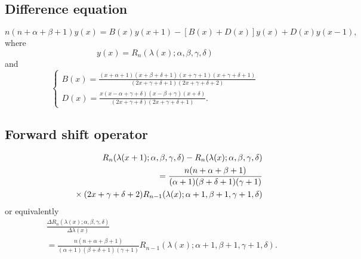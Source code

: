 \documentclass[envcountchap,graybox]{svmono}
\newcommand{\mathindent}{\hspace{7.5mm}}
\begin{document}
\subsection*{Difference equation}
\begin{equation}
\label{dvRacah}
n(n+\alpha+\beta+1)y(x)=B(x)y(x+1)-\left[B(x)+D(x)\right]y(x)+D(x)y(x-1),
\end{equation}
where
$$y(x)=R_n(\lambda(x);\alpha,\beta,\gamma,\delta)$$
and
$$\left\{\begin{array}{l}
\displaystyle B(x)=\frac{(x+\alpha+1)(x+\beta+\delta+1)(x+\gamma+1)(x+\gamma+\delta+1)}
{(2x+\gamma+\delta+1)(2x+\gamma+\delta+2)}\\[5mm]
\displaystyle D(x)=\frac{x(x-\alpha+\gamma+\delta)(x-\beta+\gamma)(x+\delta)}{(2x+\gamma+\delta)(2x+\gamma+\delta+1)}.
\end{array}\right.$$

\subsection*{Forward shift operator}
\begin{eqnarray}
\label{shift1RacahI}
& &R_n(\lambda(x+1);\alpha,\beta,\gamma,\delta)-R_n(\lambda(x);\alpha,\beta,\gamma,\delta)\nonumber\\
& &{}=\frac{n(n+\alpha+\beta+1)}{(\alpha+1)(\beta+\delta+1)(\gamma+1)}\nonumber\\
& &{}\mathindent{}\times(2x+\gamma+\delta+2)R_{n-1}(\lambda(x);\alpha+1,\beta+1,\gamma+1,\delta)
\end{eqnarray}
or equivalently
\begin{eqnarray}
\label{shift1RacahII}
& &\frac{\Delta R_n(\lambda(x);\alpha,\beta,\gamma,\delta)}{\Delta\lambda(x)}\nonumber\\
& &{}=\frac{n(n+\alpha+\beta+1)}{(\alpha+1)(\beta+\delta+1)(\gamma+1)}
R_{n-1}(\lambda(x);\alpha+1,\beta+1,\gamma+1,\delta).
\end{eqnarray}
\end{document}
